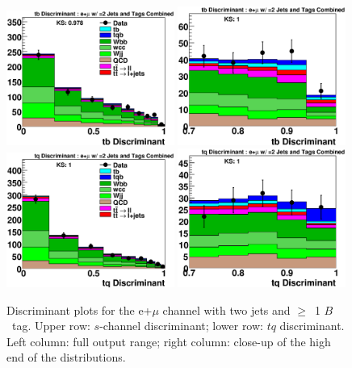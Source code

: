 \begin{figure}[!h!tbp]
\includegraphics[width=0.49\textwidth]
{eps/MatrixElement/output/2jet/All_tb_Discriminant.eps}
\includegraphics[width=0.49\textwidth]
{eps/MatrixElement/output/2jet/All_tb_Discriminant_Zoom.eps}
\includegraphics[width=0.49\textwidth]
{eps/MatrixElement/output/2jet/All_tq_Discriminant.eps}
\includegraphics[width=0.49\textwidth]
{eps/MatrixElement/output/2jet/All_tq_Discriminant_Zoom.eps}
\vspace{-0.1in}
\caption{Discriminant plots for the e+$\mu$ channel with two jets and
$\geq$~1 $B$~tag. Upper row: $s$-channel discriminant; lower row: $tq$
discriminant. Left column: full output range; right column: close-up
of the high end of the distributions.}
\label{e21_2j}
\end{figure}


